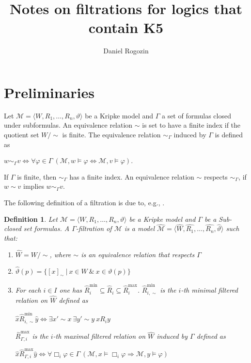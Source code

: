 \documentclass[a4paper]{article}
\author{Daniel Rogozin}
\date{}
\title{Notes on filtrations for logics that contain {\bf K5}}
\theoremstyle{defin}
\newtheorem{defin}{Definition}
\theoremstyle{theorem}
\theoremstyle{prop}
\theoremstyle{lemma}
\theoremstyle{fact}
\theoremstyle{ex}
\theoremstyle{col}
\theoremstyle{claim}
\begin{document}
\maketitle

\section{Preliminaries}


Let $\mathcal{M} = \langle W, R_1, \dots, R_n, \vartheta \rangle$ be a Kripke model and $\Gamma$ a set of formulas closed under subformulas. An equivalence relation $\sim$ is set to have a finite index if the quotient set $W / \sim$ is finite. The equivalence relation $\sim_{\Gamma}$ induced by $\Gamma$ is defined as

\begin{center}
  $w \sim_{\Gamma} v \Leftrightarrow \forall \varphi \in \Gamma \: (\mathcal{M}, w \models \varphi \Leftrightarrow \mathcal{M}, v \models \varphi)$.
\end{center}

If $\Gamma$ is finite, then $\sim_{\Gamma}$ has a finite index. An equivalence relation $\sim$ respects $\sim_{\Gamma}$, if $w \sim v$ implies $w \sim_{\Gamma} v$.

The following definition of a filtration is due to, e.g., \cite{shehtman2004filtration}.

\begin{defin}
  Let $\mathcal{M} = \langle W, R_1, \dots, R_n, \vartheta \rangle$ be a Kripke model and $\Gamma$ be a Sub-closed set formulas. A $\Gamma$-filtration of $\mathcal{M}$ is a model
  $\widehat{\mathcal{M}} = \langle \widehat{W}, \widehat{R_1}, \dots, \widehat{R_n}, \widehat{\vartheta} \rangle$ such that:
  \begin{enumerate}
    \item $\widehat{W} = W / \sim$, where $\sim$ is an equivalence relation that respects $\Gamma$
    \item $\widehat{\vartheta}(p) = \{ [x]_{\sim} \: | \: x \in W \: \& \: x \in \vartheta(p)\}$
    \item For each $i \in I$ one has $\widehat{R}_i^{\text{min}} \subseteq \widehat{R}_i \subseteq \widehat{R}_i^{\text{max}}$. $\widehat{R}_{i, \sim}^{\text{min}}$ is the $i$-th minimal filtered relation on $\widehat{W}$ defined as
    \begin{center}
      $\hat{x} \widehat{R}_{i, \sim}^{\text{min}} \hat{y} \Leftrightarrow \exists x' \sim x \: \exists y' \sim y \: x R_i y$
    \end{center}
    $\widehat{R}_{\Gamma,i}^{\text{max}}$ is the $i$-th maximal filtered relation on $\widehat{W}$ induced by $\Gamma$ defined as
    \begin{center}
      $\hat{x} \widehat{R}_{\Gamma,i}^{\text{max}} \hat{y} \Leftrightarrow \forall \Box_i \varphi \in \Gamma \: (\mathcal{M}, x \models \Box_i \varphi \Rightarrow \mathcal{M}, y \models \varphi)$
    \end{center}
  \end{enumerate}
\end{defin}
\end{document}
